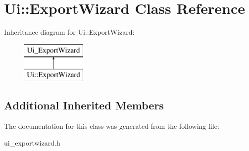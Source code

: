 \hypertarget{class_ui_1_1_export_wizard}{}\section{Ui\+:\+:Export\+Wizard Class Reference}
\label{class_ui_1_1_export_wizard}
Inheritance diagram for Ui\+:\+:Export\+Wizard\+:\begin{figure}[H]
\begin{center}
\leavevmode
\includegraphics[height=2.000000cm]{class_ui_1_1_export_wizard}
\end{center}
\end{figure}
\subsection*{Additional Inherited Members}


The documentation for this class was generated from the following file\+:\begin{DoxyCompactItemize}
\item 
ui\+\_\+exportwizard.\+h\end{DoxyCompactItemize}
